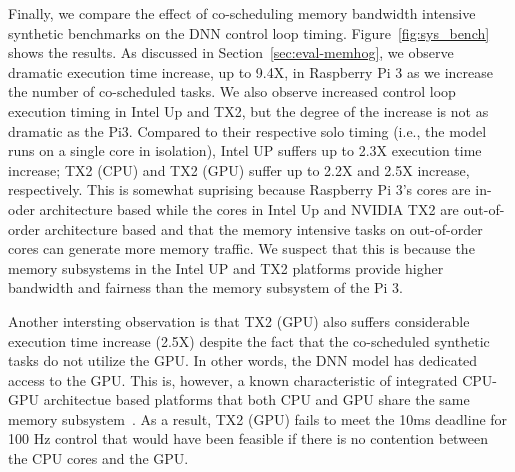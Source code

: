 Finally, we compare the effect of co-scheduling memory bandwidth
intensive synthetic benchmarks on the DNN control loop timing. 
Figure~\ref{fig:sys_bench} shows the results.
As discussed in 
Section~\ref{sec:eval-memhog}, we observe dramatic execution time
increase, up to 9.4X, in Raspberry Pi 3 as we increase the number of
co-scheduled tasks. We also observe increased control loop execution
timing in Intel Up and TX2, but the degree of the increase is not as
dramatic as the Pi3. Compared to their respective solo timing (i.e.,
the model runs on a single core in isolation), Intel UP suffers up to
2.3X execution time increase; TX2 (CPU) and TX2 (GPU) suffer up to
2.2X and 2.5X increase, respectively. This is somewhat suprising
because Raspberry Pi 3's cores are in-oder architecture based while
the cores in Intel Up and NVIDIA TX2 are out-of-order architecture
based and that the memory intensive tasks on out-of-order cores can
generate more memory traffic. We suspect that this is because the
memory subsystems in the Intel UP and TX2 platforms provide higher
bandwidth and fairness than the memory subsystem of the Pi 3.

Another intersting observation is that TX2 (GPU) also suffers
considerable execution time increase (2.5X) despite the fact that the
co-scheduled synthetic tasks do not utilize the GPU. In other words,
the DNN model has dedicated access to the GPU. This is, however, a
known characteristic of integrated CPU-GPU architectue based
platforms that both CPU and GPU share the same memory
subsystem~\cite{Ali2017}. As a result, TX2 (GPU) fails to meet the
10ms deadline for 100 Hz control that would have been feasible if
there is no contention between the CPU cores and the GPU.


